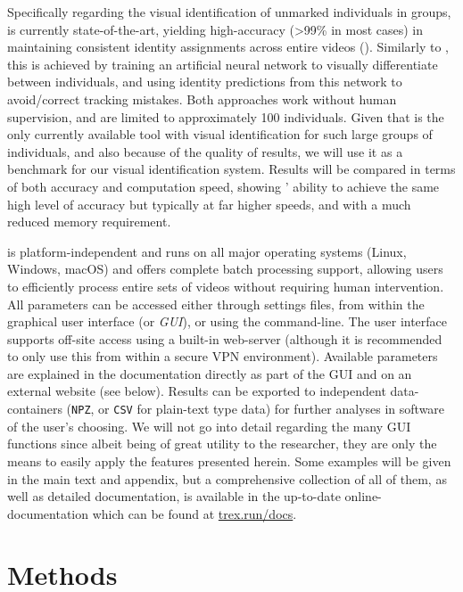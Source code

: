 \documentclass[9pt,lineno]{elife}
\newcommand{\idtracker}{\protect\path{ idtracker.ai}}
\newcommand{\TRex}{\protect\path{TRex}}
\begin{document}
Specifically regarding the visual identification of unmarked individuals in groups, \idtracker{} is currently state-of-the-art, yielding high-accuracy (>99\% in most cases) in maintaining consistent identity assignments across entire videos (\cite{idtrackerai}). Similarly to \TRex{}, this is achieved by training an artificial neural network to visually differentiate between individuals, and using identity predictions from this network to avoid/correct tracking mistakes. Both approaches work without human supervision, and are limited to approximately 100 individuals. Given that \idtracker{} is the only currently available tool with visual identification for such large groups of individuals, and also because of the quality of results, we will use it as a benchmark for our visual identification system. Results will be compared in terms of both accuracy and computation speed, showing \TRex{}' ability to achieve the same high level of accuracy but typically at far higher speeds, and with a much reduced memory requirement.

\TRex{} is platform-independent and runs on all major operating systems (Linux, Windows, macOS) and offers complete batch processing support, allowing users to efficiently process entire sets of videos without requiring human intervention. All parameters can be accessed either through settings files, from within the graphical user interface (or \textit{GUI}), or using the command-line. The user interface supports off-site access using a built-in web-server (although it is recommended to only use this from within a secure VPN environment). Available parameters are explained in the documentation directly as part of the GUI and on an external website (see below). Results can be exported to independent data-containers (\texttt{NPZ}, or \texttt{CSV} {\color{blue} for plain-text type data}) for further analyses in software of the user's choosing. We will not go into detail regarding the many GUI functions since albeit being of great utility to the researcher, they are only the means to easily apply the features presented herein. Some examples will be given in the main text and appendix, but a comprehensive collection of all of them, as well as detailed documentation, is available in the up-to-date online-documentation which can be found at \href{https://trex.run/docs}{trex.run/docs}.


\section{Methods}
\end{document}
